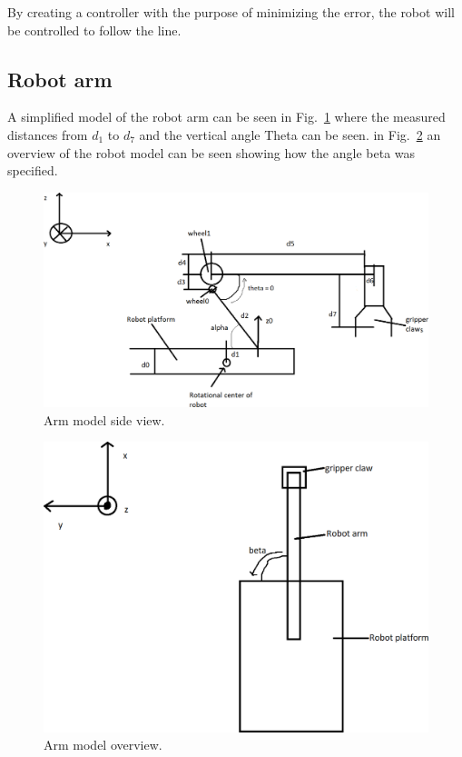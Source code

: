 By creating a controller with the purpose of minimizing the error, the robot will be controlled to follow the line.

\subsection{Robot arm}
\label{sec:simon2}
A simplified model of the robot arm can be seen in Fig.~\ref{Arm_model} where the measured distances from \(d_1\) to \(d_7\) and the vertical angle Theta can be seen. in Fig.~\ref{arm_overview} an overview of the robot model can be seen showing how the angle beta was specified.
\begin{figure}[h]
    \centering
    \includegraphics[width=\linewidth]{sections/assets/Arm_model.png}
    \caption{Arm model side view.}
    \label{Arm_model}
\end{figure}
\begin{figure}[h]
    \centering
    \includegraphics[width=\linewidth]{sections/assets/Arm_overview.png}
    \caption{Arm model overview.}
    \label{arm_overview}
\end{figure}

